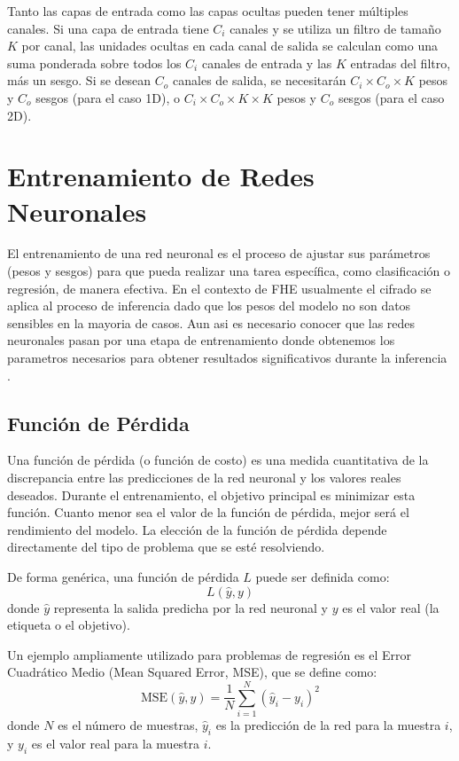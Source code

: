 Tanto las capas de entrada como las capas ocultas pueden tener múltiples canales. Si una capa de entrada tiene $C_i$ canales y se utiliza un filtro de tamaño $K$ por canal, las unidades ocultas en cada canal de salida se calculan como una suma ponderada sobre todos los $C_i$ canales de entrada y las $K$ entradas del filtro, más un sesgo. Si se desean $C_o$ canales de salida, se necesitarán $C_i \times C_o \times K$ pesos y $C_o$ sesgos (para el caso 1D), o $C_i \times C_o \times K \times K$ pesos y $C_o$ sesgos (para el caso 2D).

\section{Entrenamiento de Redes Neuronales} 

El entrenamiento de una red neuronal es el proceso de ajustar sus parámetros (pesos y sesgos) para que pueda realizar una tarea específica, como clasificación o regresión, de manera efectiva. En el contexto de FHE usualmente el cifrado se aplica al proceso de inferencia dado que los pesos del modelo no son datos sensibles en la mayoria de casos. Aun asi es necesario conocer que las redes neuronales pasan por una etapa de entrenamiento donde obtenemos los parametros necesarios para obtener resultados significativos durante la inferencia \cite{Goodfellow16}.

\subsection{Función de Pérdida}
Una función de pérdida (o función de costo) es una medida cuantitativa de la discrepancia entre las predicciones de la red neuronal y los valores reales deseados. Durante el entrenamiento, el objetivo principal es minimizar esta función. Cuanto menor sea el valor de la función de pérdida, mejor será el rendimiento del modelo. La elección de la función de pérdida depende directamente del tipo de problema que se esté resolviendo.

De forma genérica, una función de pérdida $L$ puede ser definida como:
\begin{equation}
L(\hat{y}, y)
\end{equation}
donde $\hat{y}$ representa la salida predicha por la red neuronal y $y$ es el valor real (la etiqueta o el objetivo).

Un ejemplo ampliamente utilizado para problemas de regresión es el Error Cuadrático Medio (Mean Squared Error, MSE), que se define como:
\begin{equation}
\text{MSE}(\hat{y}, y) = \frac{1}{N} \sum_{i=1}^{N} (\hat{y}_i - y_i)^2
\end{equation}
donde $N$ es el número de muestras, $\hat{y}_i$ es la predicción de la red para la muestra $i$, y $y_i$ es el valor real para la muestra $i$. 

